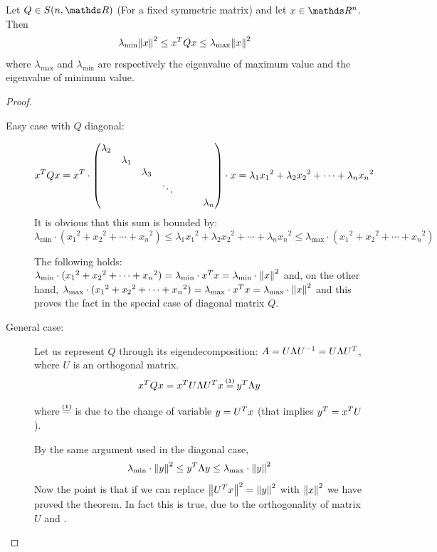 \documentclass[computationalMathematics.tex]{subfiles}
\begin{document}
\begin{proposition}
  Let $Q \in S(n, \R)$ (For a fixed symmetric matrix) and let $x \in \R^n$. Then 
  \[
    \lambda_{\text{min}} {\left\lVert x\right\rVert}^2 \le {x}^{T}Qx \le \lambda_{\text{max}} {\left\lVert x\right\rVert}^2
  \]
  where $\lambda_{\text{max}}$ and $\lambda_{\text{min}}$ are respectively the eigenvalue of maximum value and the eigenvalue of minimum value.
\end{proposition}

\begin{proof}
  \begin{description}
    \item[{\sc Easy case with $Q$ diagonal:}]
    
      \[{x}^{T}Qx = {x}^{T} \cdot \begin{pmatrix}
    \lambda_2\\
    &\lambda_1\\
    &&\lambda_3\\
    &&& \ddots\\
    &&&&&&\lambda_n\\
    \end{pmatrix}
      \cdot x = \lambda_1 {x_1}^2 + \lambda_2 {x_2}^2 + \cdots + \lambda_n {x_n}^2
      \]
  It is obvious that this sum is bounded by:
  \[
    \lambda_{\text{min}} \cdot ({x_1}^2 +{x_2}^2 + \cdots + {x_n}^2) \le  \lambda_1 {x_1}^2 + \lambda_2 {x_2}^2 + \cdots + \lambda_n {x_n}^2 \le \lambda_{\text{max}} \cdot ({x_1}^2 +{x_2}^2 + \cdots + {x_n}^2)
  \]

   The following holds: $ \lambda_{\text{min}} \cdot ({x_1}^2 +{x_2}^2 + \cdots + {x_n}^2) =  \lambda_{\text{min}} \cdot {x}^{T} x =  \lambda_{\text{min}} \cdot {\left\lVert x\right\rVert}^2$ and, on the other hand, $ \lambda_{\text{max}} \cdot ({x_1}^2 +{x_2}^2 + \cdots + {x_n}^2) =  \lambda_{\text{max}} \cdot {x}^{T} x =  \lambda_{\text{max}} \cdot {\left\lVert x\right\rVert}^2$ and this proves the fact in the special case of diagonal matrix $Q$.
    \item[{\sc General case:}]
      Let us represent $Q$ through its eigendecomposition: $A = U \Lambda {U}^{-1} = U \Lambda {U}^{T}$, where $U$ is an orthogonal matrix.
      \[
        \tr{x}Qx = \tr{x} U \Lambda \tr{U} x \numeq{(1)} \tr{y} \Lambda y
      \]

      where $\numeq{(1)}$ is due to the change of variable $y = {U}^{T} x$ (that implies ${y}^{T} = {x}^{T} U$).

      By the same argument used in the diagonal case,
      \[
        \lambda_{\text{min}} \cdot {\left\lVert y\right\rVert}^2 \le {y}^{T} \Lambda y \le \lambda_{\text{max}} \cdot {\left\lVert y\right\rVert}^2
      \]
      Now the point is that if we can replace ${\left\lVert{U}^{T}x\right\rVert}^2 = {\left\lVert y\right\rVert}^2$ with ${\left\lVert x\right\rVert}^2$ we have proved the theorem.
      In fact this is true, due to the orthogonality of matrix $U$ and .
  \end{description}
\end{proof}
\end{document}
